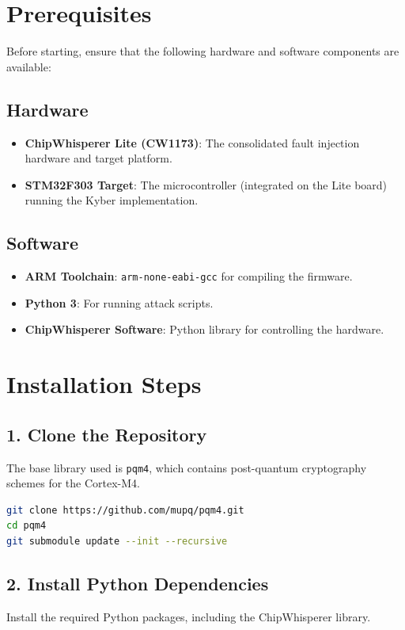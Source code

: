 \section{Prerequisites}
Before starting, ensure that the following hardware and software components are available:

\subsection{Hardware}
\begin{itemize}
    \item \textbf{ChipWhisperer Lite (CW1173)}: The consolidated fault injection hardware and target platform.
    \item \textbf{STM32F303 Target}: The microcontroller (integrated on the Lite board) running the Kyber implementation.
\end{itemize}

\subsection{Software}
\begin{itemize}
    \item \textbf{ARM Toolchain}: \texttt{arm-none-eabi-gcc} for compiling the firmware.
    \item \textbf{Python 3}: For running attack scripts.
    \item \textbf{ChipWhisperer Software}: Python library for controlling the hardware.
\end{itemize}

\section{Installation Steps}

\subsection{1. Clone the Repository}
The base library used is \texttt{pqm4}, which contains post-quantum cryptography schemes for the Cortex-M4.

\begin{lstlisting}[language=bash]
git clone https://github.com/mupq/pqm4.git
cd pqm4
git submodule update --init --recursive
\end{lstlisting}

\subsection{2. Install Python Dependencies}
Install the required Python packages, including the ChipWhisperer library.


